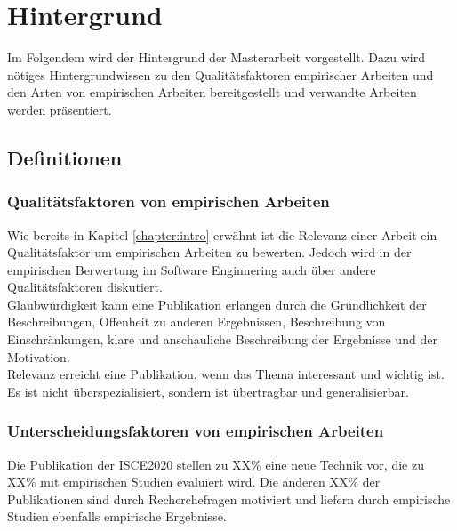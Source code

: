 \chapter{Hintergrund}
\label{chapter:background}
Im Folgendem wird der Hintergrund der Masterarbeit vorgestellt. Dazu wird nötiges Hintergrundwissen zu den Qualitätsfaktoren empirischer Arbeiten und den Arten von empirischen Arbeiten bereitgestellt und verwandte Arbeiten werden präsentiert.\\

\section{Definitionen}

\subsection{Qualitätsfaktoren von empirischen Arbeiten}
Wie bereits in Kapitel \ref{chapter:intro} erwähnt ist die Relevanz einer Arbeit ein Qualitätsfaktor um empirischen Arbeiten zu bewerten. Jedoch wird in der empirischen Berwertung im Software Enginnering auch über andere Qualitätsfaktoren diskutiert. \\

Glaubwürdigkeit kann eine Publikation erlangen durch die Gründlichkeit der Beschreibungen, Offenheit zu anderen Ergebnissen, Beschreibung von Einschränkungen, klare und anschauliche Beschreibung der Ergebnisse und der Motivation. \\

Relevanz erreicht eine Publikation, wenn das Thema interessant und wichtig ist. Es ist nicht überspezialisiert, sondern ist übertragbar und generalisierbar. \\




\subsection{Unterscheidungsfaktoren von empirischen Arbeiten}
\label{sec:empi}
Die Publikation der ISCE2020 stellen zu XX\% eine neue Technik vor, die zu XX\% mit empirischen Studien evaluiert wird. Die anderen XX\% der Publikationen sind durch Recherchefragen motiviert und liefern durch empirische Studien ebenfalls empirische Ergebnisse. \\

